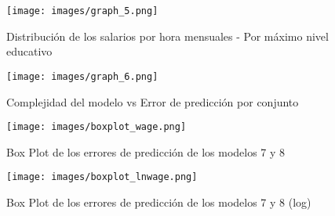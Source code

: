 \documentclass[11pt,oneside]{article}
\begin{document}
\begin{figure}[H]
    \centering
    \caption{Distribución de los salarios por hora mensuales - Por máximo nivel educativo}
    \label{fig:graph_5}
        \texttt{[image: images/graph\_5.png]} \\
\end{figure}


\begin{figure}[H]
    \centering
    \caption{Complejidad del modelo vs Error de predicción por conjunto}
    \label{fig:graph_6}
        \texttt{[image: images/graph\_6.png]} \\
\end{figure}




\begin{figure}[H]
    \centering
    \caption{Box Plot de los errores de predicción de los modelos 7 y 8}
    \label{fig:3c3_boxplot}
        \texttt{[image: images/boxplot\_wage.png]} \\
\end{figure}
\begin{figure}[H]
    \centering
    \caption{Box Plot de los errores de predicción de los modelos 7 y 8 (log)}
    \label{fig:3c3_boxplot_log}
        \texttt{[image: images/boxplot\_lnwage.png]} \\
\end{figure}
\end{document}
